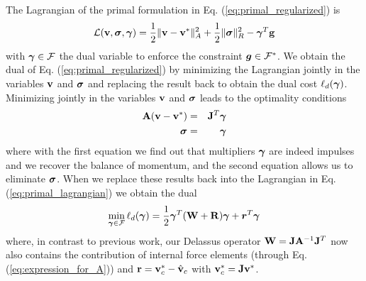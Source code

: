 \begin{IEEEproof}
The Lagrangian of the primal formulation in Eq. (\ref{eq:primal_regularized}) is
\begin{equation}
	\mathcal{L}(\mf{v},\bsigma,\vf{\gamma}) = 
	\frac{1}{2}\Vert\mf{v}-\mf{v}^*\Vert_A^2 + \frac{1}{2} \Vert\bsigma\Vert_{R}^2 - \vf{\gamma}^T\mf{g}
	\label{eq:primal_lagrangian}
\end{equation}
with ${\bm{\gamma}}\in\mathcal{F}$ the dual variable to enforce the constraint
${\bm{g}}\in \mathcal{F}^*$. We obtain the dual of Eq.
(\ref{eq:primal_regularized}) by minimizing the Lagrangian jointly in the
variables ${\mathbf{v}}$ and ${\bm\sigma}$ and replacing the result back to obtain the
dual cost $\ell_d({\bm{\gamma}})$. Minimizing jointly in the variables ${\mathbf{v}}$
and ${\bm\sigma}$ leads to the optimality conditions
\begin{eqnarray}
	{\mathbf{A}}({\mathbf{v}}-{\mathbf{v}}^*) &=& {\mathbf{J}}^T{\bm{\gamma}}\\
	{\bm{\sigma}} &=& {\bm{\gamma}}
\end{eqnarray}
where with the first equation we find out that multipliers ${\bm\gamma}$ are indeed
impulses and we recover the balance of momentum, and the second equation allows
us to eliminate ${\bm{\sigma}}$. When we replace these results back into the
Lagrangian in Eq. (\ref{eq:primal_lagrangian}) we obtain the dual
\begin{eqnarray}
	\min_{{\bm\gamma}\in \mathcal{F}} \ell_d({\bm\gamma}) =
	\frac{1}{2}{\bm\gamma}^T(\mathbf{W}+\mathbf{R}){\bm\gamma} + {\bm r}^T
	{\bm\gamma}
\end{eqnarray}
where, in contrast to previous work, our Delassus operator
${\mathbf{W}}={\mathbf{J}}{\mathbf{A}}^{-1}{\mathbf{J}}^T$ now also contains the contribution of internal
force elements (through Eq. (\ref{eq:expression_for_A})) and
${\mathbf{r}}={\mathbf{v}}_c^*-\hat{{\mathbf{v}}}_c$ with ${\mathbf{v}}_c^*={\mathbf{J}}{\mathbf{v}}^*$.
\end{IEEEproof}

